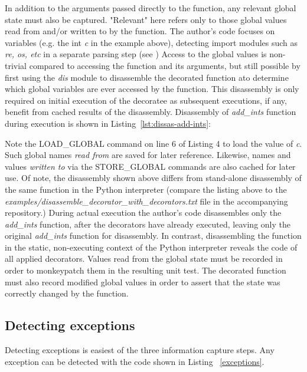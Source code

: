 In addition to the arguments passed directly to the function, any relevant 
global state must also be captured. "Relevant" here refers only to those 
global values read from and/or written to by the function.
The author's code focuses on variables (e.g. the int \textit{c} in the example above), 
detecting import modules such as \textit{re, os, etc} in a separate parsing step 
(see )
Access to the global values is non-trivial compared to accessing the function 
and its arguments, but still possible by first using the \textit{dis}
module to disassemble the decorated function ato determine which global variables 
are ever accessed by the function.  This disassembly is only 
required on initial execution of the decoratee as subsequent executions, if any, 
benefit from cached results of the disassembly.
Disassembly of \textit{add\_ints} function during execution is shown
in Listing~\ref{lst:dissas-add-ints}:



Note the LOAD\_GLOBAL command on line 6 of Listing 4 to load the value of 
\textit{c}.  Such global names \textit{read from} are saved for later reference.  
Likewise, names and values \textit{written to} via 
the STORE\_GLOBAL commands are also cached for later use.
%
Of note, the disassembly shown above differs from stand-alone disassembly of 
the same function in the Python interpreter (compare the listing above to the
\textit{examples/disassemble\_decorator\_with\_decorators.txt} file in the 
accompanying repository.)
During actual execution the author's code disassembles only the
\textit{add\_ints} function, after the decorators
have already executed, leaving only the original  \textit{add\_ints}
function for disassembly.
In contrast, disassembling the function in the static, non-executing context of
the Python interpreter reveals the code of all applied decorators.  
%
Values read from the global state must be recorded 
in order to monkeypatch them in the resulting unit test.
%
The decorated function must also record modified global values in
order to assert that the state was correctly changed by the function.

\subsection{Detecting exceptions}\label{sec:approach-internal-3}
Detecting exceptions is easiest of the three information capture steps.
Any exception can be detected with the code shown in Listing 
~\ref{exceptions}.

